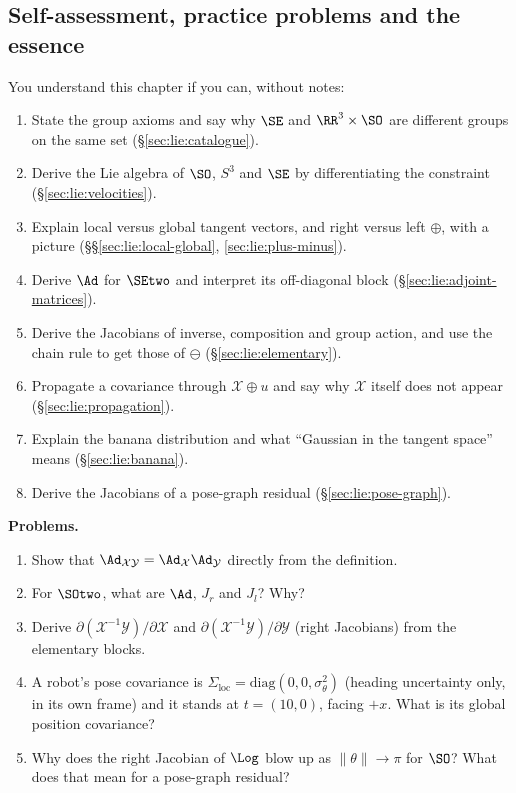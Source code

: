 \subsection{Self-assessment, practice problems and the essence}\label{sec:lie:problems}

You understand this chapter if you can, without notes:
\begin{enumerate}[label=\arabic*.,itemsep=1pt]
\item State the group axioms and say why $\SE$ and $\RR^3\times\SO$ are different groups on the same set (\S\ref{sec:lie:catalogue}).
\item Derive the Lie algebra of $\SO$, $S^3$ and $\SE$ by differentiating the constraint (\S\ref{sec:lie:velocities}).
\item Explain local versus global tangent vectors, and right versus left $\oplus$, with a picture (\S\S\ref{sec:lie:local-global}, \ref{sec:lie:plus-minus}).
\item Derive $\Ad$ for $\SEtwo$ and interpret its off-diagonal block (\S\ref{sec:lie:adjoint-matrices}).
\item Derive the Jacobians of inverse, composition and group action, and use the chain rule to get those of $\ominus$ (\S\ref{sec:lie:elementary}).
\item Propagate a covariance through $\mathcal X\oplus u$ and say why $\mathcal X$ itself does not appear (\S\ref{sec:lie:propagation}).
\item Explain the banana distribution and what ``Gaussian in the tangent space'' means (\S\ref{sec:lie:banana}).
\item Derive the Jacobians of a pose-graph residual (\S\ref{sec:lie:pose-graph}).
\end{enumerate}

\textbf{Problems.}
\begin{enumerate}[label=\textbf{P\arabic*.},itemsep=2pt]
\item Show that $\Ad_{\mathcal X\mathcal Y}=\Ad_{\mathcal X}\Ad_{\mathcal Y}$ directly from the definition.
\item For $\SOtwo$, what are $\Ad$, $J_r$ and $J_l$? Why?
\item Derive $\partial(\mathcal X^{-1}\mathcal Y)/\partial\mathcal X$ and $\partial(\mathcal X^{-1}\mathcal Y)/\partial\mathcal Y$ (right Jacobians) from the elementary blocks.
\item A robot's pose covariance is $\Sigma_{\text{loc}}=\mathrm{diag}(0,0,\sigma_\theta^2)$ (heading uncertainty only, in its own frame) and it stands at $t=(10,0)$, facing $+x$. What is its global position covariance?
\item Why does the right Jacobian of $\Log$ blow up as $\|\theta\|\to\pi$ for $\SO$? What does that mean for a pose-graph residual?
\end{enumerate}

